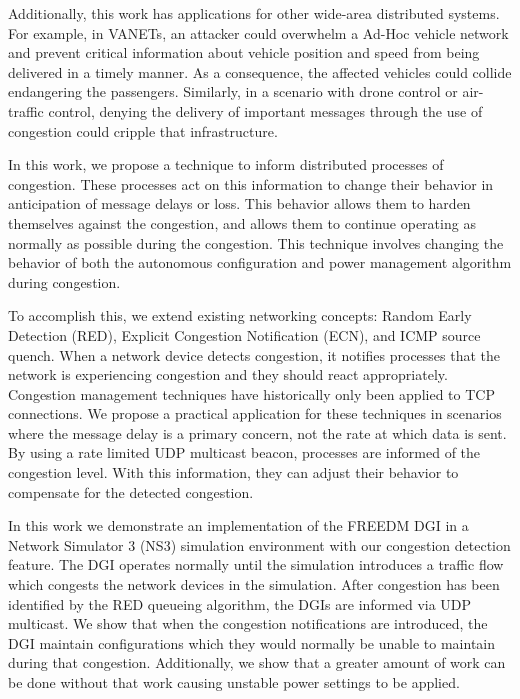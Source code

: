 Additionally, this work has applications for other wide-area distributed systems.
For example, in VANETs, an attacker could overwhelm a Ad-Hoc vehicle network and prevent critical information about vehicle position and speed from being delivered in a timely manner.
As a consequence, the affected vehicles could collide endangering the passengers.
Similarly, in a scenario with drone control or air-traffic control, denying the delivery of important messages through the use of congestion could cripple that infrastructure.

In this work, we propose a technique to inform distributed processes of congestion.
These processes act on this information to change their behavior in anticipation of message delays or loss.
This behavior allows them to harden themselves against the congestion, and allows them to continue operating as normally as possible during the congestion.
This technique involves changing the behavior of both the autonomous configuration and power management algorithm during congestion.

To accomplish this, we extend existing networking concepts: Random Early Detection (RED), Explicit Congestion Notification (ECN), and ICMP source quench.
When a network device detects congestion, it notifies processes that the network is experiencing congestion and they should react appropriately.
Congestion management techniques have historically only been applied to TCP connections.
We propose a practical application for these techniques in scenarios where the message delay is a primary concern, not the rate at which data is sent.
By using a rate limited UDP multicast beacon, processes are informed of the congestion level.
With this information, they can adjust their behavior to compensate for the detected congestion.

In this work we demonstrate an implementation of the FREEDM DGI in a Network Simulator 3 (NS3) simulation environment with our congestion detection feature.
The DGI operates normally until the simulation introduces a traffic flow which congests the network devices in the simulation.
After congestion has been identified by the RED queueing algorithm, the DGIs are informed via UDP multicast.
We show that when the congestion notifications are introduced, the DGI maintain configurations which they would normally be unable to maintain during that congestion.
Additionally, we show that a greater amount of work can be done without that work causing unstable power settings to be applied.
